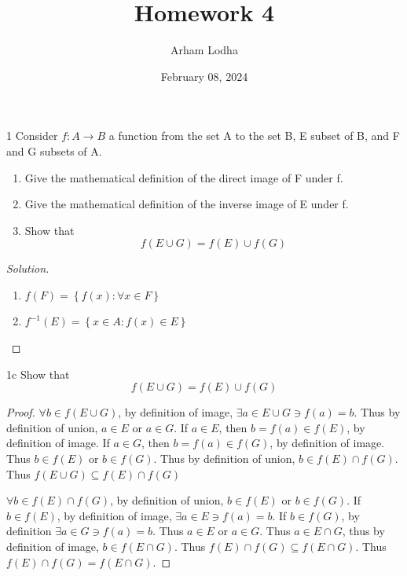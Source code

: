 \documentclass{article}
\newenvironment{solution}
{\renewcommand\qedsymbol{$\blacksquare$}\begin{proof}[Solution]}
{\end{proof}}
\begin{document}
\title{Homework 4}
\author{Arham Lodha}%
\date{February 08, 2024}%
\maketitle

\begin{PROB}{1}\label{Problem 1.}
    Consider $f : A \to B$ a function from the set A to the set B, E subset of B, and F and G subsets of A.
    \begin{enumerate}
        \item Give the mathematical definition of the direct image of F under f.
        \item Give the mathematical definition of the inverse image of E under f.
        \item Show that $$f(E \cup G) = f(E) \cup f(G)$$
    \end{enumerate}
\end{PROB}
\begin{solution}
    \begin{enumerate}
        \item $f(F) = \left\{ f(x) : \forall x \in F \right\}$ 
        \item $f^{-1}(E) = \left\{x \in A : f(x) \in E \right\}$ 
    \end{enumerate}
\end{solution}
\begin{claim}{1c}\label{Claim 1c.}
    Show that $$f(E \cup G) = f(E) \cup f(G)$$
\end{claim}
\begin{proof}
    $\forall b \in f(E \cup G)$, by definition of image, $\exists a \in E \cup G \ni f(a) = b$. Thus by definition of union, $a \in E$ or $a \in G$. If $a \in E$, then $b = f(a) \in f(E)$, by definition of image. If $a \in G$, then $b = f(a) \in f(G)$, by definition of image. Thus $b \in f(E)$ or $b \in f(G)$. Thus by definition of union, $b \in f(E) \cap f(G)$. Thus $f(E \cup G) \subseteq f(E) \cap f(G)$ 
    
    $\forall b \in f(E) \cap f(G)$, by definition of union, $b \in f(E)$ or $b \in f(G)$. If $b \in f(E)$, by definition of image, $\exists a \in E \ni f(a) = b$. If $b \in f(G)$, by definition $\exists a \in G \ni f(a) = b$. Thus $a \in E$ or $a \in G$. Thus $a \in E \cap G$, thus by definition of image, $b \in f(E \cap G)$. Thus $f(E) \cap f(G) \subseteq f(E \cap G)$. Thus $f(E) \cap f(G) = f(E \cap G)$.               
\end{proof}
\end{document}
